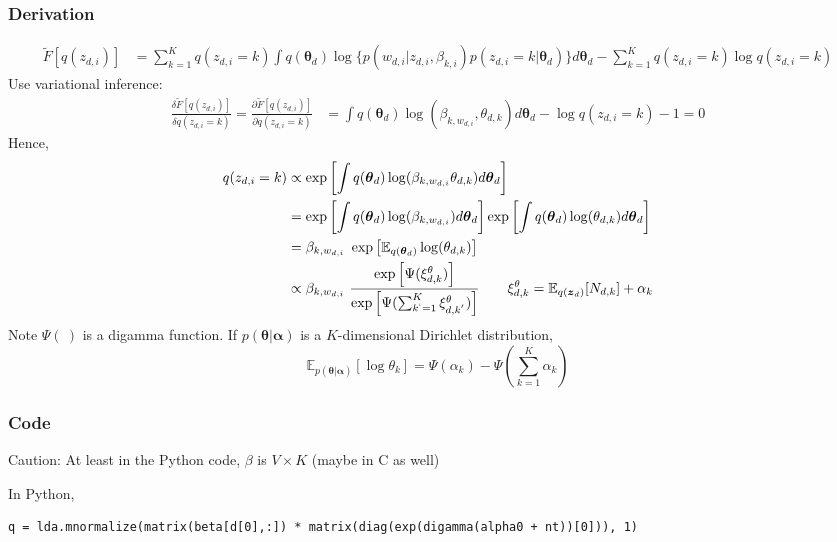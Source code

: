 \documentclass[a4paper,10.5pt,dvipdfmx]{jarticle}  %
\begin{document}
\subsubsection{Derivation}
\begin{align}
	\widetilde{F}[q(z_{d,i})] &= \sum_{k=1}^{K} q(z_{d,i} = k) \int q(\boldsymbol{\theta}_d) \log \{ p(w_{d,i} | z_{d,i}, \beta_{k,i}) p(z_{d,i} = k | \boldsymbol{\theta}_d) \} d \boldsymbol{\theta}_d - \sum_{k=1}^{K} q(z_{d,i}=k) \log q(z_{d,i}=k)
\end{align}
Use variational inference:
\begin{align}
	\frac{\delta \widetilde{F}[q(z_{d,i})]}{\delta q(z_{d,i} = k)} = \frac{\partial \widetilde{F}[q(z_{d,i})]}{\partial q(z_{d,i} = k)} &= \int q(\boldsymbol{\theta}_d) \log(\beta_{k, w_{d,i}}, \theta_{d,k}) d \boldsymbol{\theta}_d - \log q(z_{d,i} = k) - 1 = 0
\end{align}
Hence,
\begin{align}
	q(z_{d,i} = k) &\propto \exp \left[ \int q(\boldsymbol{\theta}_d) \log (\beta_{k, w_{d,i}} \theta_{d,k}) d \boldsymbol{\theta}_d \right] \\
&= \exp \left[ \int q (\boldsymbol{\theta}_d) \log(\beta_{k, w_{d,i}}) d \boldsymbol{\theta}_d \right] \exp \left[\int q(\boldsymbol{\theta}_d) \log(\theta_{d,k}) d \boldsymbol{\theta}_d  \right]\\
&= \beta_{k, w_{d,i}} \ \exp \left[ \mathbb{E}_{q(\boldsymbol{\theta}_d)} \log(\theta_{d,k}) \right]\\
&\propto \beta_{k, w_{d,i}} \ \frac{\exp \left[ \Psi( \xi_{d,k}^{\theta}) \right]}{\exp \left[ \Psi( \sum_{k^{`} = 1}^{K} \xi_{d,k^{'}}^{\theta}) \right]} \qquad \xi_{d,k}^{\theta} = \mathbb{E}_{q(\boldsymbol{z}_d)} [N_{d,k}] + \alpha_k \label{Eq:z_q}
\end{align}
Note $\Psi(\ )$ is a digamma function. If $p(\boldsymbol{\theta} | \boldsymbol{\alpha})$ is a $K$-dimensional Dirichlet distribution,$$ \mathbb{E}_{p(\boldsymbol{\theta} | \boldsymbol{\alpha})} [\log \theta_k] = \Psi(\alpha_k) - \Psi \left( \sum_{k=1}^{K} \alpha_k \right) $$

\subsubsection{Code}
\noindent
Caution: At least in the Python code, $\beta$ is $V \times K$ (maybe in C as well) \par
In Python,
\begin{lstlisting}[style=Python]
q = lda.mnormalize(matrix(beta[d[0],:]) * matrix(diag(exp(digamma(alpha0 + nt))[0])), 1)
\end{lstlisting}
\end{document}
